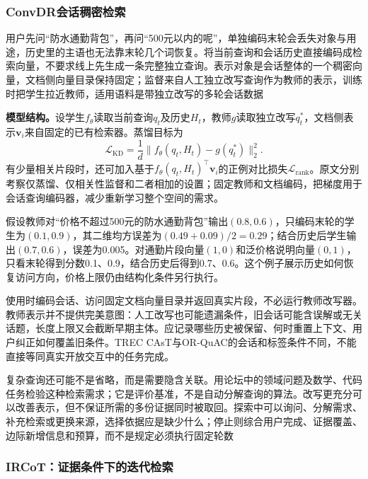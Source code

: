 \Needspace{100mm}
\subsubsection{ConvDR会话稠密检索}
\label{sec:rs-search-convdr}

用户先问“防水通勤背包”，再问“500元以内的呢”，单独编码末轮会丢失对象与用途，历史里的主语也无法靠末轮几个词恢复。将当前查询和会话历史直接编码成检索向量，不要求线上先生成一条完整独立查询。表示对象是会话整体的一个稠密向量，文档侧向量目录保持固定；监督来自人工独立改写查询作为教师的表示，训练时把学生拉近教师，适用语料是带独立改写的多轮会话数据

\textbf{模型结构。}设学生$f_\theta$读取当前查询$q_t$及历史$H_t$，教师$g$读取独立改写$q_t^*$，文档侧表示$\bm v_i$来自固定的已有检索器。蒸馏目标为
\begin{equation}
 \mathcal L_{\mathrm{KD}}
 =\frac1d\|f_\theta(q_t,H_t)-g(q_t^*)\|_2^2 .
 \label{eq:rs-search-convdr}
\end{equation}
有少量相关片段时，还可加入基于$f_\theta(q_t,H_t)^\top\bm v_i$的正例对比损失$\mathcal L_{\mathrm{rank}}$。原文分别考察仅蒸馏、仅相关性监督和二者相加的设置；固定教师和文档编码，把梯度用于会话查询编码器，减少重新学习整个空间的需求。

假设教师对“价格不超过500元的防水通勤背包”输出$(0.8,0.6)$，只编码末轮的学生为$(0.1,0.9)$，其二维均方误差为$(0.49+0.09)/2=0.29$；结合历史后学生输出$(0.7,0.6)$，误差为0.005。对通勤片段向量$(1,0)$和泛价格说明向量$(0,1)$，只看末轮得到分数0.1、0.9，结合历史后得到0.7、0.6。这个例子展示历史如何恢复访问方向，价格上限仍由结构化条件另行执行。

使用时编码会话、访问固定文档向量目录并返回真实片段，不必运行教师改写器。教师表示并不提供完美意图：人工改写也可能遗漏条件，旧会话可能含误解或无关话题，长度上限又会截断早期主体。应记录哪些历史被保留、何时重置上下文、用户纠正如何覆盖旧条件。TREC CAsT与OR-QuAC的会话和标签条件不同，不能直接等同真实开放交互中的任务完成。

复杂查询还可能不是省略，而是需要隐含关联。用论坛中的领域问题及数学、代码任务检验这种检索需求；它是评价基准，不是自动分解查询的算法。改写更充分可以改善表示，但不保证所需的多份证据同时被取回。探索中可以询问、分解需求、补充检索或更换来源，选择依据应是缺少什么；停止则综合用户完成、证据覆盖、边际新增信息和预算，而不是规定必须执行固定轮数

\Needspace{100mm}
\subsubsection{IRCoT：证据条件下的迭代检索}
\label{sec:rs-search-ircot}

